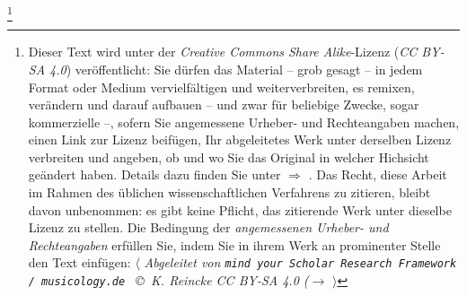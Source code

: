 %
%
%

\footnote{Dieser Text wird unter der \textit{Creative Commons Share
Alike}-Lizenz (\textit{CC BY-SA 4.0}) ver\-öffentlicht: Sie dürfen das Material
-- grob gesagt -- in jedem Format oder Medium vervielfältigen und
weiterverbreiten, es remixen, verändern und darauf aufbauen -- und zwar für
beliebige Zwecke, sogar kommerzielle --, sofern Sie angemessene Urheber- und
Rechteangaben machen, einen Link zur Lizenz beifügen, Ihr abgeleitetes Werk
unter derselben Lizenz verbreiten und angeben, ob und wo Sie das Original in
welcher Hichsicht geändert haben. Details dazu finden Sie unter $\Rightarrow$
.
Das Recht, diese Arbeit im Rahmen des üblichen wissenschaftlichen Verfahrens zu
zitieren, bleibt davon unbenommen: es gibt keine Pflicht, das zitierende Werk
unter dieselbe Lizenz zu stellen. Die Bedingung der \textit{an\-ge\-mes\-se\-nen
Urheber- und Rechteangaben} erfüllen Sie, indem Sie in ihrem Werk an prominenter
Stelle den Text einfügen: $\langle$ {\itshape Abgeleitet von \texttt{mind your
Scholar Research Framework / musicology.de } \copyright\ K. Reincke CC BY-SA 4.0
($\rightarrow$
 }
$\rangle$ }

